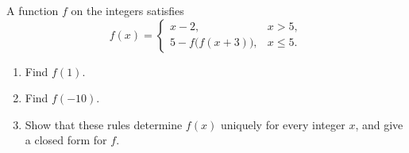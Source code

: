 A function $f$ on the integers satisfies
\[
f(x)=\begin{cases}x-2,&x>5,\\ 5-f\bigl(f(x+3)\bigr),&x\le5.\end{cases}
\]
\begin{enumerate}
\item[(a)] Find $f(1)$.
\item[(b)] Find $f(-10)$.
\item[(c)] Show that these rules determine $f(x)$ uniquely for every integer $x$, and give a closed form for $f$.
\end{enumerate}
